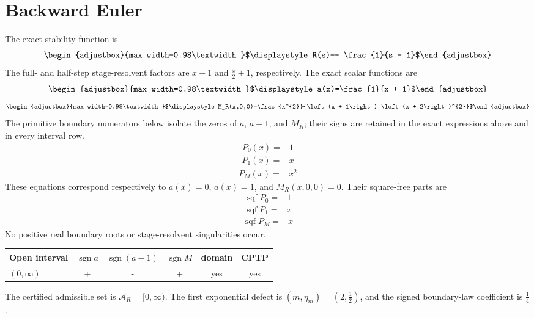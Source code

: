 \section{Backward Euler}
The exact stability function is
\[\begin{adjustbox}{max width=0.98\textwidth}$\displaystyle R(s)=- \frac{1}{s - 1}$\end{adjustbox}\]
The full- and half-step stage-resolvent factors are $x + 1$ and $\frac{x}{2} + 1$, respectively.
The exact scalar functions are
\[\begin{adjustbox}{max width=0.98\textwidth}$\displaystyle a(x)=\frac{1}{x + 1}$\end{adjustbox}\]
\[\begin{adjustbox}{max width=0.98\textwidth}$\displaystyle M_R(x,0,0)=\frac{x^{2}}{\left(x + 1\right) \left(x + 2\right)^{2}}$\end{adjustbox}\]
The primitive boundary numerators below isolate the zeros of $a$, $a-1$, and $M_R$; their signs are retained in the exact expressions above and in every interval row.
\[\begin{aligned}
P_0(x)={}&1
\end{aligned}\]
\[\begin{aligned}
P_1(x)={}&x
\end{aligned}\]
\[\begin{aligned}
P_M(x)={}&x^{2}
\end{aligned}\]
These equations correspond respectively to $a(x)=0$, $a(x)=1$, and $M_R(x,0,0)=0$. Their square-free parts are
\[\begin{aligned}
\operatorname{sqf}P_0={}&1
\end{aligned}\]
\[\begin{aligned}
\operatorname{sqf}P_1={}&x
\end{aligned}\]
\[\begin{aligned}
\operatorname{sqf}P_M={}&x
\end{aligned}\]
No positive real boundary roots or stage-resolvent singularities occur.
\begin{center}
\begin{tabular}{@{}l c c c c c@{}}
\toprule
Open interval & $\operatorname{sgn}a$ & $\operatorname{sgn}(a-1)$ & $\operatorname{sgn}M$ & domain & CPTP \\
\midrule
$(0,\infty)$ & + & - & + & yes & yes \\
\bottomrule
\end{tabular}
\end{center}
The certified admissible set is $\mathcal A_R=[0,\infty)$. The first exponential defect is $(m,\eta_m)=(2,\frac{1}{2})$, and the signed boundary-law coefficient is $\frac{1}{4}$.
